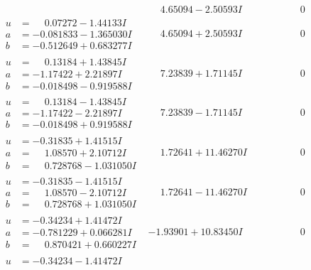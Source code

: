 \documentclass[1p]{elsarticle_modified}
\theoremstyle{definition}
\begin{document}
$$\begin{array}{c|c|c}
 & \phantom{-}4.65094 - 2.50593 I & \phantom{-0.000000 } 0 \\ \hline\begin{aligned}
u &= \phantom{-}0.07272 - 1.44133 I \\
a &= -0.081833 - 1.365030 I \\
b &= -0.512649 + 0.683277 I\end{aligned}
 & \phantom{-}4.65094 + 2.50593 I & \phantom{-0.000000 } 0 \\ \hline\begin{aligned}
u &= \phantom{-}0.13184 + 1.43845 I \\
a &= -1.17422 + 2.21897 I \\
b &= -0.018498 - 0.919588 I\end{aligned}
 & \phantom{-}7.23839 + 1.71145 I & \phantom{-0.000000 } 0 \\ \hline\begin{aligned}
u &= \phantom{-}0.13184 - 1.43845 I \\
a &= -1.17422 - 2.21897 I \\
b &= -0.018498 + 0.919588 I\end{aligned}
 & \phantom{-}7.23839 - 1.71145 I & \phantom{-0.000000 } 0 \\ \hline\begin{aligned}
u &= -0.31835 + 1.41515 I \\
a &= \phantom{-}1.08570 + 2.10712 I \\
b &= \phantom{-}0.728768 - 1.031050 I\end{aligned}
 & \phantom{-}1.72641 + 11.46270 I & \phantom{-0.000000 } 0 \\ \hline\begin{aligned}
u &= -0.31835 - 1.41515 I \\
a &= \phantom{-}1.08570 - 2.10712 I \\
b &= \phantom{-}0.728768 + 1.031050 I\end{aligned}
 & \phantom{-}1.72641 - 11.46270 I & \phantom{-0.000000 } 0 \\ \hline\begin{aligned}
u &= -0.34234 + 1.41472 I \\
a &= -0.781229 + 0.066281 I \\
b &= \phantom{-}0.870421 + 0.660227 I\end{aligned}
 & -1.93901 + 10.83450 I & \phantom{-0.000000 } 0 \\ \hline\begin{aligned}
u &= -0.34234 - 1.41472 I \\

\end{aligned}
\end{array}$$
\end{document}
